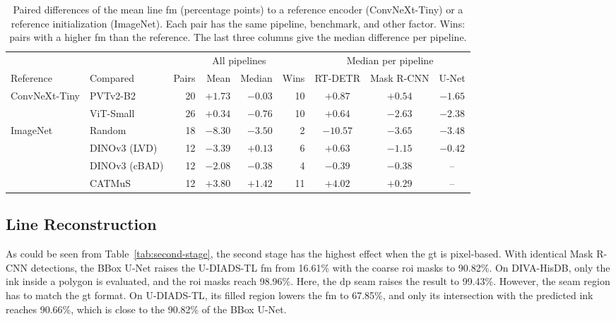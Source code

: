 \begin{table}[htbp]
    \centering
    \footnotesize
    \setlength{\tabcolsep}{2.5pt}
    \caption{Paired differences of the mean line \gls{fm} (percentage points) to a reference encoder (ConvNeXt-Tiny) or a reference initialization (ImageNet). Each pair has the same pipeline, benchmark, and other factor. Wins: pairs with a higher \gls{fm} than the reference. The last three columns give the median difference per pipeline.}
    \label{tab:rq1-paired}\label{tab:rq1-grouped}\label{tab:rq1-factor-ranges}
    \begin{tabular}{@{}llrrrrccc@{}}
        \toprule
        & & \multicolumn{4}{c}{All pipelines} & \multicolumn{3}{c}{Median per pipeline} \\
        \cmidrule(lr){3-6}\cmidrule(l){7-9}
        Reference & Compared & Pairs & Mean & Median & Wins & RT-DETR & Mask R-CNN & U-Net \\
        \midrule
        ConvNeXt-Tiny & PVTv2-B2 & 20 & $+1.73$ & $-0.03$ & 10 & $+0.87$ & $+0.54$ & $-1.65$ \\
                        & ViT-Small & 26 & $+0.34$ & $-0.76$ & 10 & $+0.64$ & $-2.63$ & $-2.38$ \\
        \midrule
        ImageNet & Random & 18 & $-8.30$ & $-3.50$ & 2 & $-10.57$ & $-3.65$ & $-3.48$ \\
                        & DINOv3 (LVD) & 12 & $-3.39$ & $+0.13$ & 6 & $+0.63$ & $-1.15$ & $-0.42$ \\
                        & DINOv3 (cBAD) & 12 & $-2.08$ & $-0.38$ & 4 & $-0.39$ & $-0.38$ & -- \\
                        & CATMuS & 12 & $+3.80$ & $+1.42$ & 11 & $+4.02$ & $+0.29$ & -- \\
        \bottomrule
    \end{tabular}
\end{table}

\FloatBarrier
\subsection{Line Reconstruction}
\label{sec:results-reconstruction}
\label{sec:results-components}
\label{sec:results-integration}\label{app:boundary-reconstruction}\label{sec:results-dp-seam}
As could be seen from Table~\ref{tab:second-stage}, the second stage has the highest effect when the \gls{gt} is pixel-based. With identical Mask R-CNN detections, the BBox U-Net raises the U-DIADS-TL \gls{fm} from 16.61\% with the coarse \gls{roi} masks to 90.82\%. On DIVA-HisDB, only the ink inside a polygon is evaluated, and the \gls{roi} masks reach 98.96\%. Here, the \gls{dp} seam raises the result to 99.43\%. However, the seam region has to match the \gls{gt} format. On U-DIADS-TL, its filled region lowers the \gls{fm} to 67.85\%, and only its intersection with the predicted ink reaches 90.66\%, which is close to the 90.82\% of the BBox U-Net.

